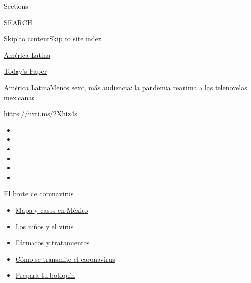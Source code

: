 Sections

SEARCH

\protect\hyperlink{site-content}{Skip to
content}\protect\hyperlink{site-index}{Skip to site index}

\href{https://www.nytimes.com/es/section/america-latina}{América Latina}

\href{https://myaccount.nytimes.com/auth/login?response_type=cookie\&client_id=vi}{}

\href{https://www.nytimes.com/section/todayspaper}{Today's Paper}

\href{/es/section/america-latina}{América Latina}\textbar{}Menos sexo,
más audiencia: la pandemia reanima a las telenovelas mexicanas

\url{https://nyti.ms/2Xhtz4s}

\begin{itemize}
\item
\item
\item
\item
\item
\item
\end{itemize}

\href{https://www.nytimes.com/es/spotlight/coronavirus?action=click\&pgtype=Article\&state=default\&region=TOP_BANNER\&context=storylines_menu}{El
brote de coronavirus}

\begin{itemize}
\tightlist
\item
  \href{https://www.nytimes.com/es/interactive/2020/espanol/america-latina/coronavirus-en-mexico.html?action=click\&pgtype=Article\&state=default\&region=TOP_BANNER\&context=storylines_menu}{Mapa
  y casos en México}
\item
  \href{https://www.nytimes.com/es/2020/07/31/espanol/ciencia-y-tecnologia/ninos-contagio-coronavirus.html?action=click\&pgtype=Article\&state=default\&region=TOP_BANNER\&context=storylines_menu}{Los
  niños y el virus}
\item
  \href{https://www.nytimes.com/es/interactive/2020/science/coronavirus-tratamientos-curas.html?action=click\&pgtype=Article\&state=default\&region=TOP_BANNER\&context=storylines_menu}{Fármacos
  y tratamientos}
\item
  \href{https://www.nytimes.com/es/2020/07/06/espanol/ciencia-y-tecnologia/coronavirus-transmision-aire.html?action=click\&pgtype=Article\&state=default\&region=TOP_BANNER\&context=storylines_menu}{Cómo
  se transmite el coronavirus}
\item
  \href{https://www.nytimes.com/es/2020/07/14/espanol/estilos-de-vida/botiquin-medicina-coronavirus.html?action=click\&pgtype=Article\&state=default\&region=TOP_BANNER\&context=storylines_menu}{Prepara
  tu botiquín}
\end{itemize}


